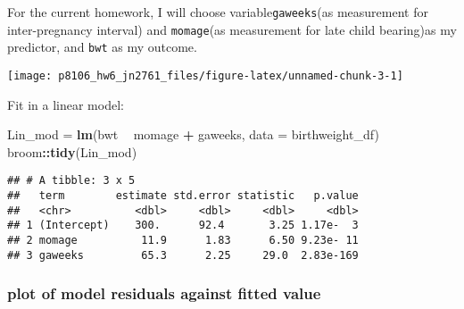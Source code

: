\documentclass[]{article}
\newenvironment{Shaded}{\begin{snugshade}}{\end{snugshade}}
\newcommand{\DataTypeTok}[1]{\textcolor[rgb]{0.13,0.29,0.53}{#1}}
\newcommand{\FloatTok}[1]{\textcolor[rgb]{0.00,0.00,0.81}{#1}}
\newcommand{\KeywordTok}[1]{\textcolor[rgb]{0.13,0.29,0.53}{\textbf{#1}}}
\newcommand{\NormalTok}[1]{#1}
\newcommand{\OperatorTok}[1]{\textcolor[rgb]{0.81,0.36,0.00}{\textbf{#1}}}
\newcommand{\StringTok}[1]{\textcolor[rgb]{0.31,0.60,0.02}{#1}}
\begin{document}
For the current homework, I will choose variable\texttt{gaweeks}(as
measurement for inter-pregnancy interval) and \texttt{momage}(as
measurement for late child bearing)as my predictor, and \texttt{bwt} as
my outcome.

\begin{Shaded}
\end{Shaded}

\texttt{[image: p8106\_hw6\_jn2761\_files/figure-latex/unnamed-chunk-3-1]}

Fit in a linear model:

\begin{Shaded}
\begin{Highlighting}[]
\NormalTok{Lin_mod =}\StringTok{ }\KeywordTok{lm}\NormalTok{(bwt }\OperatorTok{~}\StringTok{ }\NormalTok{momage }\OperatorTok{+}\StringTok{ }\NormalTok{gaweeks, }\DataTypeTok{data =}\NormalTok{ birthweight_df)}
\NormalTok{broom}\OperatorTok{::}\KeywordTok{tidy}\NormalTok{(Lin_mod)}
\end{Highlighting}
\end{Shaded}

\begin{verbatim}
## # A tibble: 3 x 5
##   term        estimate std.error statistic   p.value
##   <chr>          <dbl>     <dbl>     <dbl>     <dbl>
## 1 (Intercept)    300.      92.4       3.25 1.17e-  3
## 2 momage          11.9      1.83      6.50 9.23e- 11
## 3 gaweeks         65.3      2.25     29.0  2.83e-169
\end{verbatim}

\hypertarget{plot-of-model-residuals-against-fitted-value}{%
\subsubsection{plot of model residuals against fitted
value}\label{plot-of-model-residuals-against-fitted-value}}
\end{document}
